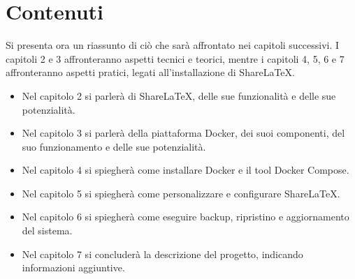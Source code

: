 \section{Contenuti}
Si presenta ora un riassunto di ciò che sarà affrontato nei capitoli successivi. I capitoli 2 e 3 affronteranno aspetti tecnici e teorici, mentre i capitoli 4, 5, 6 e 7 affronteranno aspetti pratici, legati all'installazione di ShareLaTeX.
\begin{itemize}
    \item Nel capitolo 2 si parlerà di ShareLaTeX, delle sue funzionalità e delle sue potenzialità.
    \item Nel capitolo 3 si parlerà della piattaforma Docker, dei suoi componenti, del suo funzionamento e delle sue potenzialità.
    \item Nel capitolo 4 si spiegherà come installare Docker e il tool Docker Compose.
    \item Nel capitolo 5 si spiegherà come personalizzare e configurare ShareLaTeX.
    \item Nel capitolo 6 si spiegherà come eseguire backup, ripristino e aggiornamento del sistema.
    \item Nel capitolo 7 si concluderà la descrizione del progetto, indicando informazioni aggiuntive.
\end{itemize}